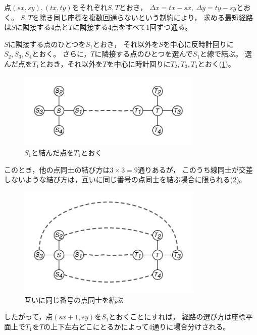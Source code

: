 \documentclass{article}
\begin{document}
点$(sx, sy), (tx, ty)$をそれぞれ$S, T$とおき，
$\Delta x = tx - sx,\ \Delta y = ty - sy$とおく。
$S, T$を除き同じ座標を複数回通らないという制約により，
求める最短経路は$S$に隣接する4点と$T$に隣接する4点をすべて1回ずつ通る。

$S$に隣接する点のひとつを$S_1$とおき，
それ以外を$S$を中心に反時計回りに$S_2, S_3, S_4$とおく。
さらに，$T$に隣接する点のひとつを選んで$S_1$と線で結ぶ。
選んだ点を$T_1$とおき，それ以外を$T$を中心に時計回りに$T_2, T_3, T_4$とおく(\ref{g1})。

\begin{figure}[h]
    \begin{center}
        \includegraphics[width=250pt]{fig1.png}
        \caption{$S_1$と結んだ点を$T_1$とおく}
        \label{g1}
    \end{center}
\end{figure}

このとき，他の点同士の結び方は$3 \times 3 = 9$通りあるが，
このうち線同士が交差しないような結び方は，互いに同じ番号の点同士を結ぶ場合に限られる(\ref{g2})。

\begin{figure}[h]
    \begin{center}
        \includegraphics[width=250pt]{fig2.png}
        \caption{互いに同じ番号の点同士を結ぶ}
        \label{g2}
    \end{center}
\end{figure}

したがって，点$(sx + 1, sy)$を$S_1$とおくことにすれば，
経路の選び方は座標平面上で$T_1$を$T$の上下左右どこにとるかによって4通りに場合分けされる。
\end{document}
